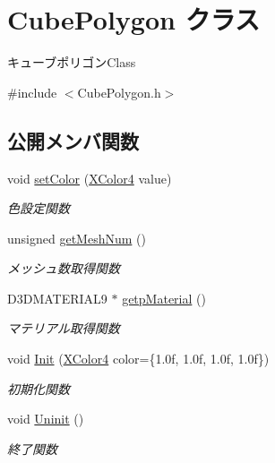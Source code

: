 \hypertarget{class_cube_polygon}{}\section{Cube\+Polygon クラス}
\label{class_cube_polygon}


キューブポリゴン\+Class  




{\ttfamily \#include $<$Cube\+Polygon.\+h$>$}

\subsection*{公開メンバ関数}
\begin{DoxyCompactItemize}
\item 
void \mbox{\hyperlink{class_cube_polygon_a8b127a1bdec7373c0dcf73540f4d9df1}{set\+Color}} (\mbox{\hyperlink{_vector3_d_8h_a680c30c4a07d86fe763c7e01169cd6cc}{X\+Color4}} value)
\begin{DoxyCompactList}\small\item\em 色設定関数 \end{DoxyCompactList}\item 
unsigned \mbox{\hyperlink{class_cube_polygon_a50970957b530b7089487799210b14903}{get\+Mesh\+Num}} ()
\begin{DoxyCompactList}\small\item\em メッシュ数取得関数 \end{DoxyCompactList}\item 
D3\+D\+M\+A\+T\+E\+R\+I\+A\+L9 $\ast$ \mbox{\hyperlink{class_cube_polygon_a1f0d02ebec205f6263b1b10800505d32}{getp\+Material}} ()
\begin{DoxyCompactList}\small\item\em マテリアル取得関数 \end{DoxyCompactList}\item 
void \mbox{\hyperlink{class_cube_polygon_a2c1adca6cd359db7947118a326756411}{Init}} (\mbox{\hyperlink{_vector3_d_8h_a680c30c4a07d86fe763c7e01169cd6cc}{X\+Color4}} color=\{1.\+0f, 1.\+0f, 1.\+0f, 1.\+0f\})
\begin{DoxyCompactList}\small\item\em 初期化関数 \end{DoxyCompactList}\item 
void \mbox{\hyperlink{class_cube_polygon_a38d28c7285ef8a75cb5b0a69a90ac829}{Uninit}} ()
\begin{DoxyCompactList}\small\item\em 終了関数 \end{DoxyCompactList}\item 

\end{DoxyCompactItemize}

